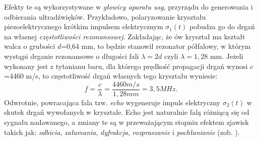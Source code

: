 Efekty te są wykorzystywane w \textit{głowicy aparatu usg}, przyrządu do generowania i odbierania ultradźwięków. Przykładowo, polaryzowanie kryształu piezoelektrycznego krótkim impulsem elektrycznym $\sigma_1(t)$ pobudza go do drgań na własnej \textit{częstotliwości rezonansowej}. Zakładając, że ów kryształ ma kształt walca o grubości $d$=0,64 mm, to będzie stanowił rezonator półfalowy, w którym wystąpi drganie rezonansowe o długości fali $\lambda = 2d$ czyli $\lambda = 1,28$ mm. Jeżeli wykonany jest z tytanianu baru, dla którego prędkość propagacji drgań wynosi $c$=4460 m/s, to częstotliwość drgań własnych tego kryształu wyniesie:
\begin{equation}
f = \frac{c}{\lambda} = \frac{4460 m/s}{1,28 mm} = 3,5 MHz.
\end{equation}
Odwrotnie, powracająca fala tzw. \textit{echo} wygeneruje impuls elektryczny $\sigma_2(t)$ w skutek drgań wywołanych w krysztale. Echo jest naturalnie falą różniącą się od sygnału nadawanego, a zmiany te są w przeważającym stopniu efektem zjawisk takich jak: \textit{odbicia}, \textit{załamania}, \textit{dyfrakcja}, \textit{rozpraszanie} i \textit{pochłanianie} (zob. \cite{makarewicz1978}).

